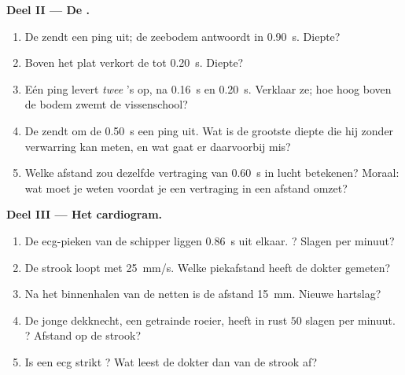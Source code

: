 \begin{problem}[{Weekendopgave --- de signalen van de wereld lezen: één
wet, $d = v\,t$, meet een storm, brengt een zeebodem in kaart, telt een
hartslag en ontrafelt hoe gps werkt}]
\medskip
\noindent\textbf{Deel II --- De .}
\begin{enumerate}[resume]
  \item De  zendt een ping uit; de zeebodem antwoordt in
        \qty{0.90}{s}. Diepte?
  \item Boven het plat verkort de  tot \qty{0.20}{s}. Diepte?
  \item Eén ping levert \emph{twee} 's op, na \qty{0.16}{s} en
        \qty{0.20}{s}. Verklaar ze; hoe hoog boven de bodem zwemt de
        vissenschool?
  \item De  zendt om de \qty{0.50}{s} een ping uit. Wat is de
        grootste diepte die hij zonder verwarring kan meten, en wat gaat
        er daarvoorbij mis?
  \item Welke afstand zou dezelfde vertraging van \qty{0.60}{s} in lucht
        betekenen? Moraal: wat moet je weten voordat je een vertraging in
        een afstand omzet?
\end{enumerate}

\medskip
\noindent\textbf{Deel III --- Het cardiogram.}
\begin{enumerate}[resume]
  \item De ecg-pieken van de schipper liggen \qty{0.86}{s} uit elkaar.
        ? Slagen per minuut?
  \item De strook loopt met \qty{25}{mm/s}. Welke piekafstand heeft de
        dokter gemeten?
  \item Na het binnenhalen van de netten is de afstand \qty{15}{mm}.
        Nieuwe hartslag?
  \item De jonge dekknecht, een getrainde roeier, heeft in rust $50$
        slagen per minuut. ? Afstand op de strook?
  \item Is een ecg strikt ? Wat leest de dokter dan van de
        strook af?
\end{enumerate}


\end{problem}
